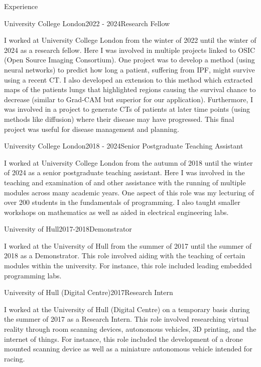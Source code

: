\documentclass{cv}
\begin{document}
    \begin{rSection}{Experience}
        \begin{rSubsection}{University College London}{2022 - 2024}{Research Fellow}{}
            \item I worked at University College London from the winter of 2022 until the winter of 2024 as a research fellow. Here I was involved in multiple projects linked to OSIC (Open Source Imaging Consortium). One project was to develop a method (using neural networks) to predict how long a patient, suffering from IPF, might survive using a recent CT. I also developed an extension to this method which extracted maps of the patients lungs that highlighted regions causing the survival chance to decrease (similar to Grad-CAM but superior for our application). Furthermore, I was involved in a project to generate CTs of patients at later time points (using methods like diffusion) where their disease may have progressed. This final project was useful for disease management and planning.
        \end{rSubsection}
        
        \begin{rSubsection}{University College London}{2018 - 2024}{Senior Postgraduate Teaching Assistant}{}
            \item I worked at University College London from the autumn of 2018 until the winter of 2024 as a senior postgraduate teaching assistant. Here I was involved in the teaching and examination of and other assistance with the running of multiple modules across many academic years. One aspect of this role was my lecturing of over 200 students in the fundamentals of programming. I also taught smaller workshops on mathematics as well as aided in electrical engineering labs.
        \end{rSubsection}
        
        \begin{rSubsection}{University of Hull}{2017-2018}{Demonstrator}{}
            \item I worked at the University of Hull from the summer of 2017 until the summer of 2018 as a Demonstrator. This role involved aiding with the teaching of certain modules within the university. For instance, this role included leading embedded programming labs.
        \end{rSubsection}
        
        \begin{rSubsection}{University of Hull (Digital Centre)}{2017}{Research Intern}{}
            \item I worked at the University of Hull (Digital Centre) on a temporary basis during the summer of 2017 as a Research Intern. This role involved researching virtual reality through room scanning devices, autonomous vehicles, 3D printing, and the internet of things. For instance, this role included the development of a drone mounted scanning device as well as a miniature autonomous vehicle intended for racing.
        \end{rSubsection}
        

\end{rSection}
\end{document}
